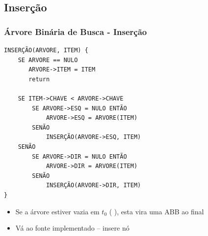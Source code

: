 \subsection{Inserção}
\begin{frame}[fragile]
\frametitle{Árvore Binária de Busca - Inserção}
\begin{small}
\begin{verbatim}
INSERÇÃO(ARVORE, ITEM) {
    SE ARVORE == NULO
       ARVORE->ITEM = ITEM
       return     
       
    SE ITEM->CHAVE < ARVORE->CHAVE
        SE ARVORE->ESQ = NULO ENTÃO
            ARVORE->ESQ = ARVORE(ITEM)
        SENÃO
            INSERÇÃO(ARVORE->ESQ, ITEM)
    SENÃO
        SE ARVORE->DIR = NULO ENTÃO
            ARVORE->DIR = ARVORE(ITEM)
        SENÃO
            INSERÇÃO(ARVORE->DIR, ITEM)
}
\end{verbatim}
\end{small}

\begin{itemize}

  \item Se a árvore estiver vazia em $t_0$ (\smiley{}  \blacksmiley{}), 
        esta vira uma ABB ao final
  \item Vá ao fonte implementado -- insere nó

\end{itemize}

\end{frame}

